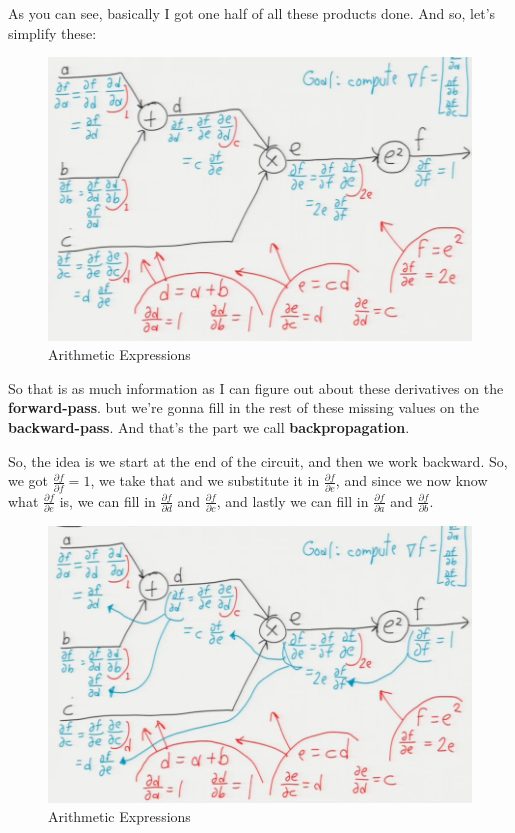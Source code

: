 \documentclass[fleqn,10pt]{olplainarticle}
\theoremstyle{definition}
\theoremstyle{remark}
\begin{document}
As you can see, basically I got one half of all these products done. And so, let's simplify these:
\begin{figure}[ht]
\centering
\includegraphics[width=0.6\linewidth]{images/arithmetic_expression_9}
\caption{Arithmetic Expressions}
\label{fig:arithmetic_expression_9}
\end{figure}
\clearpage

So that is as much information as I can figure out about these derivatives on the \textbf{forward-pass}. but we're gonna fill in the rest of these missing values on the \textbf{backward-pass}. And that's the part we call \textbf{backpropagation}.

So, the idea is we start at the end of the circuit, and then we work backward. So, we got $\frac{\partial f}{\partial f} = 1$, we take that and we substitute it in $\frac{\partial f}{\partial e}$, and since we now know what $\frac{\partial f}{\partial e}$ is, we can fill in $\frac{\partial f}{\partial d}$ and $\frac{\partial f}{\partial c}$, and lastly we can fill in $\frac{\partial f}{\partial a}$ and $\frac{\partial f}{\partial b}$. 
\begin{figure}[ht]
\centering
\includegraphics[width=0.6\linewidth]{images/arithmetic_expression_10}
\caption{Arithmetic Expressions}
\label{fig:arithmetic_expression_10}
\end{figure}
\end{document}
